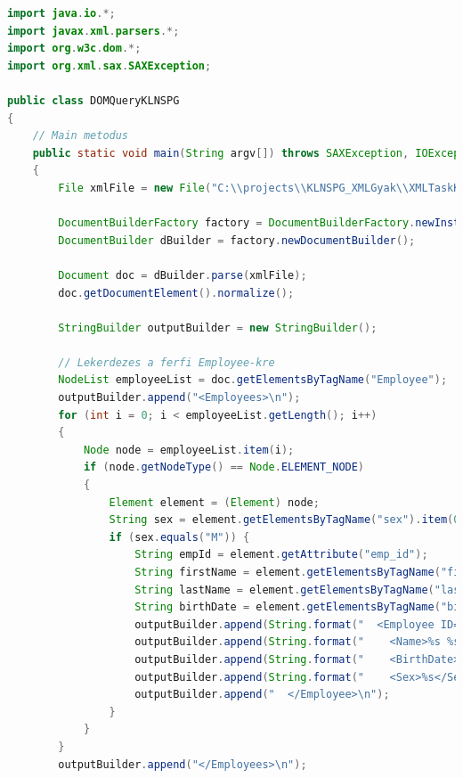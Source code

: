 \documentclass[12pt]{report}
\begin{document}
\begin{lstlisting}[caption={DOMQueryKLNSPG.java} olvasó program, language=Java]
import java.io.*;
import javax.xml.parsers.*;
import org.w3c.dom.*;
import org.xml.sax.SAXException;

public class DOMQueryKLNSPG
{
	// Main metodus
	public static void main(String argv[]) throws SAXException, IOException, ParserConfigurationException 
	{
		File xmlFile = new File("C:\\projects\\KLNSPG_XMLGyak\\XMLTaskKLNSPG\\XMLKLNSPG.xml");
		
		DocumentBuilderFactory factory = DocumentBuilderFactory.newInstance();
		DocumentBuilder dBuilder = factory.newDocumentBuilder();
		
		Document doc = dBuilder.parse(xmlFile);
		doc.getDocumentElement().normalize();
		
		StringBuilder outputBuilder = new StringBuilder();
		
		// Lekerdezes a ferfi Employee-kre
		NodeList employeeList = doc.getElementsByTagName("Employee");
		outputBuilder.append("<Employees>\n");
		for (int i = 0; i < employeeList.getLength(); i++) 
		{
			Node node = employeeList.item(i);
			if (node.getNodeType() == Node.ELEMENT_NODE) 
			{
				Element element = (Element) node;
				String sex = element.getElementsByTagName("sex").item(0).getTextContent();
				if (sex.equals("M")) {
					String empId = element.getAttribute("emp_id");
					String firstName = element.getElementsByTagName("first_name").item(0).getTextContent();
					String lastName = element.getElementsByTagName("last_name").item(0).getTextContent();
					String birthDate = element.getElementsByTagName("birth_date").item(0).getTextContent();
					outputBuilder.append(String.format("  <Employee ID=\"%s\">\n", empId));
					outputBuilder.append(String.format("    <Name>%s %s</Name>\n", firstName, lastName));
					outputBuilder.append(String.format("    <BirthDate>%s</BirthDate>\n", birthDate));
					outputBuilder.append(String.format("    <Sex>%s</Sex>\n", sex));
					outputBuilder.append("  </Employee>\n");
				}
			}
		}
		outputBuilder.append("</Employees>\n");
		

\end{lstlisting}
\end{document}
